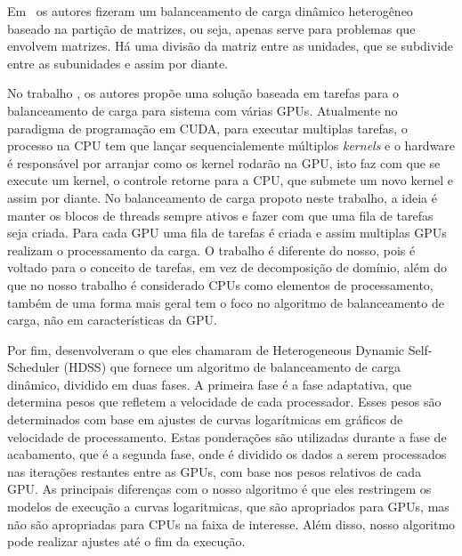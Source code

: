 Em~\citep{Clarke:2012:HPA:2402420.2402479}  os autores fizeram um balanceamento de carga dinâmico heterogêneo baseado na partição de matrizes, ou seja, apenas serve para problemas que envolvem matrizes. Há uma divisão da matriz entre as unidades, que se subdivide entre as subunidades e assim por diante. 

No trabalho \citep{chen2010dynamic}, os autores propõe uma solução baseada em tarefas para o balanceamento de carga para sistema com várias GPUs. Atualmente no paradigma de programação em CUDA, para executar multiplas tarefas, o processo na CPU tem que lançar sequencialemente múltiplos \emph{kernels} e o hardware é responsável por arranjar como os kernel rodarão na GPU, isto faz com que se execute um kernel, o controle retorne para a CPU, que submete um novo kernel e assim por diante. No balanceamento de carga propoto neste trabalho, a ideia é manter os blocos de threads sempre ativos e fazer com que uma fila de tarefas seja criada. Para cada GPU uma fila de tarefas é criada e assim multiplas GPUs realizam o processamento da carga. O trabalho é diferente do nosso, pois é voltado para o conceito de tarefas, em vez de decomposição de domínio, além do que no nosso trabalho é considerado CPUs como elementos de processamento, também de uma forma mais geral tem o foco no algoritmo de balanceamento de carga, não em características da GPU.


Por fim, \citep{HDSS} desenvolveram o que eles chamaram de Heterogeneous Dynamic Self-Scheduler (HDSS) que fornece um algoritmo de balanceamento de carga dinâmico, dividido em duas fases. A primeira fase é a fase adaptativa, que determina pesos que refletem a velocidade de cada processador. Esses pesos são determinados com base em ajustes de curvas logarítmicas em gráficos de velocidade de processamento. Estas ponderações são utilizadas durante a fase de acabamento, que é a segunda fase, onde é dividido os dados a serem processados nas iterações restantes entre as GPUs, com base nos pesos relativos de cada GPU. As principais diferenças com o nosso algoritmo é que  eles restringem os modelos de execução a curvas logaritmicas, que são apropriados para GPUs, mas não são apropriadas para CPUs na faixa de interesse. Além disso, nosso algoritmo pode realizar ajustes até o fim da execução.



